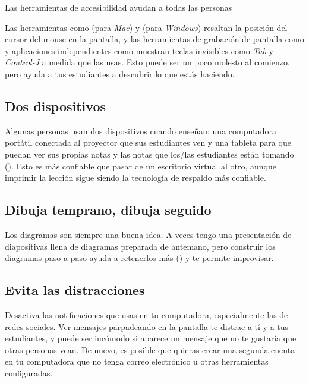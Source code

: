 \begin{aside}{Las herramientas de accesibilidad ayudan a todas las personas}

  Las herramientas como  (para \emph{Mac})
  y  (para \emph{Windows})
  resaltan la posición del cursor del mouse en la pantalla,
  y las herramientas de grabación de pantalla como 
  y aplicaciones independientes como 
  muestran teclas invisibles como \emph{Tab} y \emph{Control-J} a medida que las usas.
  Esto puede ser un poco molesto al comienzo,
  pero ayuda a tus estudiantes a descubrir lo que estás haciendo.
\end{aside}

\subsection*{Dos dispositivos}

Algunas personas usan dos dispositivos cuando enseñan:
una computadora portátil conectada al proyector que sus estudiantes ven
y una tableta para que puedan ver sus propias notas y las notas que los/las estudiantes están tomando ().
Esto es más confiable que pasar de un escritorio virtual al otro,
aunque imprimir la lección sigue siendo la tecnología de respaldo más confiable.

\subsection*{Dibuja temprano, dibuja seguido}

Los diagramas son siempre una buena idea.
A veces tengo una presentación de diapositivas llena de diagramas preparada de antemano,
pero construir los diagramas paso a paso ayuda a retenerlos más ()
y te permite improvisar.

\subsection*{Evita las distracciones}

Desactiva las notificaciones que usas en tu computadora,
especialmente las de redes sociales.
Ver mensajes parpadeando en la pantalla te distrae a tí y a tus estudiantes,
y puede ser incómodo si aparece un mensaje que no te gustaría que otras personas vean.
De nuevo,
es posible que quieras crear una segunda cuenta en tu computadora que no tenga correo electrónico u otras herramientas configuradas.

